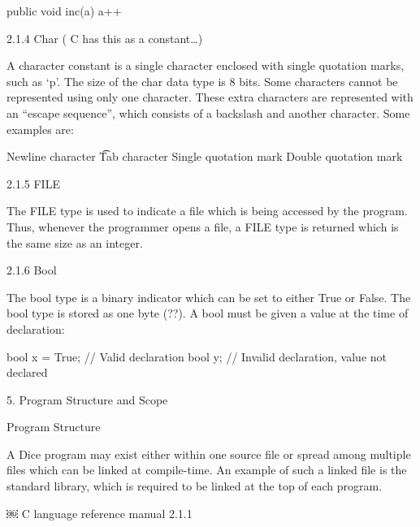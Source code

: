 \begin{homeworkProblem}
	public void inc(a) { a++ }
	
	2.1.4 Char ( C has this as a constant…)
	
	A character constant is a single character enclosed with single quotation marks, such as ‘p’. The size of the char data type is 8 bits. Some characters cannot be represented using only one character. These extra characters are represented with an “escape sequence”, which consists of a backslash and another character. Some examples are:
	
	\n  Newline character
	\t   Tab character
	\’   Single quotation mark
	\:   Double quotation mark
	
	
	2.1.5 FILE
	
	The FILE type is used to indicate a file which is being accessed by the program. Thus, whenever the programmer opens a file, a FILE type is returned which is the same size as an integer.
	
	2.1.6 Bool
	
	The bool type is a binary indicator which can be set to either True or False. The bool type is stored as one byte (??). A bool must be given a value at the time of declaration:
	
	bool x = True;  // Valid declaration
	bool y;  // Invalid declaration, value not declared
	
	
	
	
	5. Program Structure and Scope
	
	Program Structure
	
	A Dice program may exist either within one source file or spread among multiple files which can be linked at compile-time. An example of such a linked file is the standard library, which is required to be linked at the top of each program.
	
	￼ C language reference manual 2.1.1

\end{homeworkProblem}